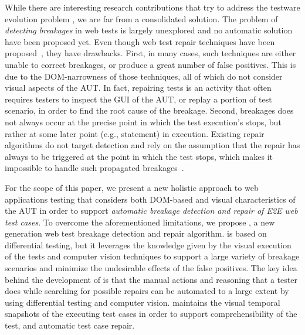 While there are interesting research contributions that try to address the testware evolution problem \cite{2016-leotta-Advances,2014-leotta-WoSAR,2015-leotta-ICST,Thummalapenta:2013:ECT:2486788.2486926,Yandrapally:2014:RTA:2610384.2610390,Choudhary:2011:WWA:2002931.2002935,Hammoudi-2016-FSE}, we are far from a consolidated solution. 
The problem of \textit{detecting breakages} in web tests is largely unexplored and no automatic solution have been proposed yet. Even though web test repair techniques have been proposed~\cite{Choudhary:2011:WWA:2002931.2002935,Hammoudi:2016:WIA:2950290.2950294,2015-leotta-ICST}, they have drawbacks. 
First, in many cases, such techniques are either unable to correct breakages, or produce a great number of false positives. 
This is due to the DOM-narrowness of those techniques, all of which do not consider visual aspects of the AUT. In fact, repairing tests is an activity that often requires testers to inspect the GUI of the AUT, or replay a portion of test scenario, in order to find the root cause of the breakage.
Second, breakages does not always occur at the precise point in which the test execution's stops, but rather at some later point (e.g., statement) in execution. Existing repair algorithms do not target detection and rely on the assumption that the repair has always to be triggered at the point in which the test stops, which makes it impossible to handle such propagated breakages~\cite{Hammoudi-2016-ICST}.


For the scope of this paper, we present a new holistic approach to  web applications testing that considers both DOM-based and visual characteristics of the AUT in order to support \textit{automatic breakage detection and repair of E2E web test cases}. 
To overcome the aforementioned limitations, we propose \tool, a new generation web test breakage detection and repair algorithm. \tool is based on differential testing, but it leverages the knowledge given by the visual execution of the tests and computer vision techniques to support a large variety of breakage scenarios and minimize the undesirable effects of the false positives. The key idea behind the development of \tool is that the manual actions and reasoning that a tester does while searching for possible repairs can be automated to a large extent by using differential testing and computer vision. 
\tool maintains the visual temporal snapshots of the executing test cases in order to support comprehensibility of the test, and automatic test case repair.


